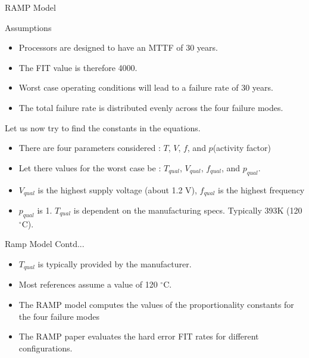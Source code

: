 \documentclass[xcolor=pdftex,dvipsnames,table,svgnames,x11names]{beamer}
\begin{document}
\begin{frame}[shrink=10]{RAMP Model}
\begin{block}{Assumptions}
 \begin{itemize}
    \item Processors are designed to have an MTTF of 30 years.
    \item The FIT value is therefore 4000. 
    \item Worst case operating conditions will lead to a failure rate of 30 years.
    \item The total failure rate is distributed evenly across the four failure modes.
 \end{itemize}
\end{block}
Let us now try to find the constants in the equations.
\begin{itemize}
 \item There are four parameters considered : $T$, $V$, $f$, and $p$(activity factor)
 \item Let there values for the worst case be : $T_{qual}$, $V_{qual}$, $f_{qual}$, and $p_{qual}$.
 \item $V_{qual}$ is the highest supply voltage (about 1.2 V), $f_{qual}$ is the highest frequency
 \item $p_{qual}$ is 1. $T_{qual}$ is dependent on the manufacturing specs. Typically 393K (120 $^\circ$C).
\end{itemize}
\end{frame}

\begin{frame}{Ramp Model Contd... }
 \begin{itemize}
  \item $T_{qual}$ is typically provided by the manufacturer.
  \item Most references assume a value of 120 $^\circ$C.
  \item The RAMP model computes the values of the proportionality constants for the four failure modes
  \item The RAMP paper evaluates the hard error FIT rates for different configurations.
 \end{itemize}
\end{frame}
\end{document}
